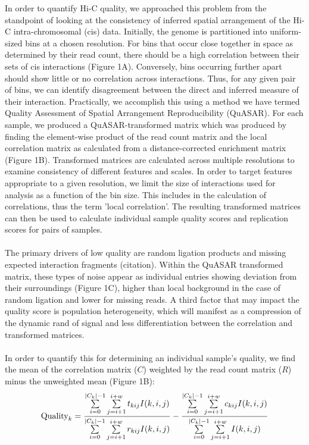 In order to quantify Hi-C quality, we approached this problem from the standpoint of looking at the consistency of inferred spatial arrangement of the Hi-C intra-chromosomal (cis) data. Initially, the genome is partitioned into uniform-sized bins at a chosen resolution. For bins that occur close together in space as determined by their read count, there should be a high correlation between their sets of cis interactions (Figure 1A). Conversely, bins occurring further apart should show little or no correlation across interactions. Thus, for any given pair of bins, we can identify disagreement between the direct and inferred measure of their interaction. Practically, we accomplish this using a method we have termed Quality Assessment of Spatial Arrangement Reproducibility (QuASAR). For each sample, we produced a QuASAR-transformed matrix which was produced by finding the element-wise product of the read count matrix and the local correlation matrix as calculated from a distance-corrected enrichment matrix (Figure 1B). Transformed matrices are calculated across multiple resolutions to examine consistency of different features and scales. In order to target features appropriate to a given resolution, we limit the size of interactions used for analysis as a function of the bin size. This includes in the calculation of correlations, thus the term 'local correlation'. The resulting transformed matrices can then be used to calculate individual sample quality scores and replication scores for pairs of samples.
\\\\
The primary drivers of low quality are random ligation products and missing expected interaction fragments (citation). Within the QuASAR transformed matrix, these types of noise appear as individual entries showing deviation from their surroundings (Figure 1C), higher than local background in the case of random ligation and lower for missing reads. A third factor that may impact the quality score is population heterogeneity, which will manifest as a compression of the dynamic rand of signal and less differentiation between the correlation and transformed matrices.
\\\\
In order to quantify this for determining an individual sample's quality, we find the mean of the correlation matrix ($C$) weighted by the read count matrix ($R$) minus the unweighted mean (Figure 1B):
\[\textnormal{Quality}_{k}=\frac{\sum\limits_{i=0}^{|C_k|-1}\sum\limits_{j=i+1}^{i+w}t_{kij}I(k,i,j)}{\sum\limits_{i=0}^{|C_k|-1}\sum\limits_{j=i+1}^{i+w}r_{kij}I(k,i,j)}-\frac{\sum\limits_{i=0}^{|C_k|-1}\sum\limits_{j=i+1}^{i+w}c_{kij}I(k,i,j)}{\sum\limits_{i=0}^{|C_k|-1}\sum\limits_{j=i+1}^{i+w}I(k,i,j)}\]

